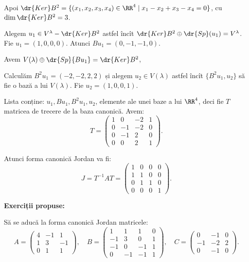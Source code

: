 Apoi $ \dr{Ker} B^2 = \{(x_1, x_2, x_3, x_4) \in \RR^4 \mid x_1 - x_2 + x_3 - x_4 = 0 \} $,
cu $ \dim \dr{Ker}B^2 = 3 $.

Alegem $ u_1 \in V^\lambda - \dr{Ker}B^2 $ astfel încît
$ \dr{Ker}B^2 \oplus \dr{Sp}(u_1) = V^\lambda $. Fie $ u_1 = (1, 0, 0, 0) $.
Atunci $Bu_1 = (0, -1, -1, 0) $.

Avem $ V(\lambda) \oplus \dr{Sp} \{ Bu_1 \} = \dr{Ker}B^2 $,

Calculăm $ B^2 u_1 = (-2, -2, 2, 2) $ și alegem $ u_2 \in V(\lambda) $ astfel
încît $ \{ B^2 u_1, u_2 \} $ să fie o bază a lui $ V(\lambda) $.
Fie $ u_2 = (1, 0, 0, 1) $.

Lista conține: $ u_1, Bu_1, B^2 u_1, u_2 $, elemente ale unei baze a lui $ \RR^4 $,
deci fie $ T $ matricea de trecere de la baza canonică. Avem:
\[
  T = \begin{pmatrix}
    1 & 0 & -2 & 1 \\
    0 & -1 & -2 & 0 \\
    0 & -1 & 2 & 0 \\
    0 & 0 & 2 & 1
  \end{pmatrix}.
\]

Atunci forma canonică Jordan va fi:
\[
  J = T^{-1} AT =
  \begin{pmatrix}
    1 & 0 & 0 & 0 \\
    1 & 1 & 0 & 0 \\
    0 & 1 & 1 & 0 \\
    0 & 0 & 0 & 1
  \end{pmatrix}.
\]
 
\vspace{1cm}

\textbf{Exerciții propuse:}

Să se aducă la forma canonică Jordan matricele:
\[
  A = \begin{pmatrix}
    4 & -1 & 1 \\
    1 & 3 & -1 \\
    0 & 1 & 1
  \end{pmatrix}, \quad
  B =
  \begin{pmatrix}
    1 & 1 & 1 & 0 \\
    -1 & 3 & 0 & 1 \\
    -1 & 0 & -1 & 1 \\
    0 & -1 & -1 & 1
  \end{pmatrix}, \quad
  C =
  \begin{pmatrix}
    0 & -1 & 0 \\
    -1 & -2 & 2 \\
    0 & -1 & 0
  \end{pmatrix}.
\]


